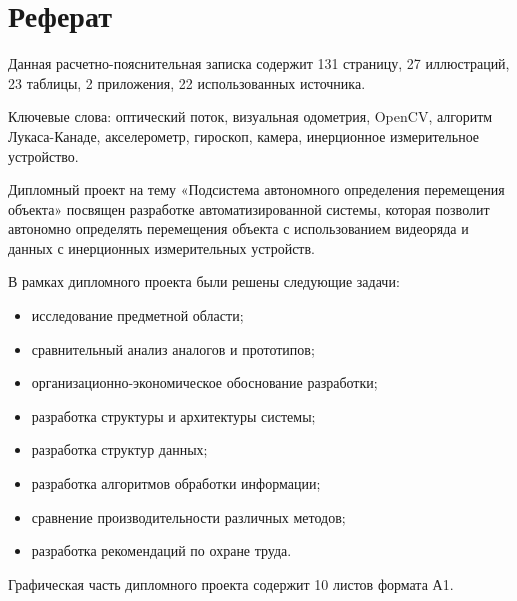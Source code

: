 \newpage
\section*{Реферат}


Данная расчетно-пояснительная записка содержит 131 страницу, 27 иллюстраций, 23 таблицы, 2 приложения, 22 использованных источника.

Ключевые слова: оптический поток, визуальная одометрия, OpenCV, алгоритм Лукаса-Канаде, акселерометр, гироскоп, камера, инерционное измерительное устройство. 

Дипломный проект на тему «Подсистема автономного определения перемещения объекта» посвящен разработке автоматизированной системы, которая позволит автономно определять перемещения объекта с использованием видеоряда и данных с инерционных измерительных устройств.

В рамках дипломного проекта были решены следующие задачи:
\begin{itemize}
\item исследование предметной области;
\item сравнительный анализ аналогов и прототипов;
\item организационно-экономическое обоснование разработки;
\item разработка структуры и архитектуры системы;
\item разработка структур данных;
\item разработка алгоритмов обработки информации;
\item сравнение производительности различных методов;
\item разработка рекомендаций по охране труда.
\end{itemize}

Графическая часть дипломного проекта содержит 10 листов формата А1.




